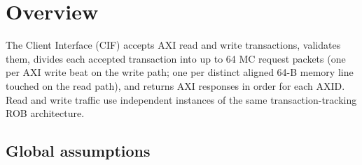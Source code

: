 \section{Overview}
\label{sec:overview}

The Client Interface (CIF) accepts AXI read and write transactions, validates
them, divides each accepted transaction into up to 64 MC request packets (one
per AXI write beat on the write path; one per distinct aligned 64-B memory
line touched on the read path), and returns AXI responses in order for each
AXID.  Read and write traffic use independent instances of the same
transaction-tracking ROB architecture.

\subsection{Global assumptions}
